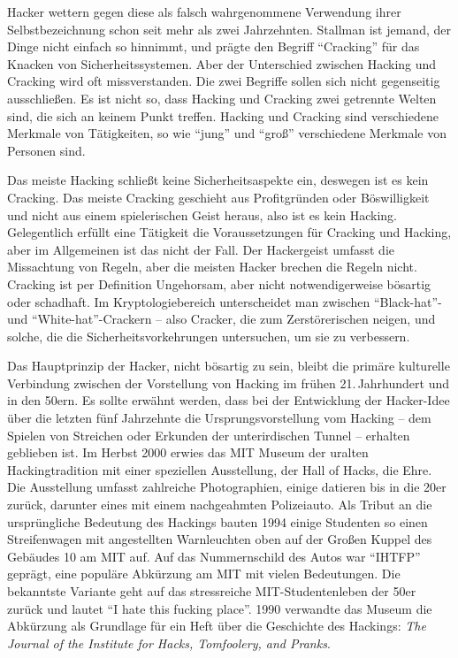 Hacker wettern gegen diese als falsch wahrgenommene Verwendung ihrer Selbstbezeichnung schon seit mehr als zwei Jahrzehnten. Stallman ist jemand, der Dinge nicht einfach so hinnimmt, und prägte den Begriff "`Cracking"' für das Knacken von Sicherheitssystemen. Aber der Unterschied zwischen Hacking und Cracking wird oft missverstanden. Die zwei Begriffe sollen sich nicht gegenseitig ausschließen. Es ist nicht so, dass Hacking und Cracking zwei getrennte Welten sind, die sich an keinem Punkt treffen. Hacking und Cracking sind verschiedene Merkmale von Tätigkeiten, so wie "`jung"' und "`groß"' verschiedene Merkmale von Personen sind.

Das meiste Hacking schließt keine Sicherheitsaspekte ein, deswegen ist es kein Cracking. Das meiste Cracking geschieht aus Profitgründen oder Böswilligkeit und nicht aus einem spielerischen Geist heraus, also ist es kein Hacking. Gelegentlich erfüllt eine Tätigkeit die Voraussetzungen für Cracking und Hacking, aber im Allgemeinen ist das nicht der Fall. Der Hackergeist umfasst die Missachtung von Regeln, aber die meisten Hacker brechen die Regeln nicht. Cracking ist per Definition Ungehorsam, aber nicht notwendigerweise bösartig oder schadhaft. Im Kryptologiebereich unterscheidet man zwischen "`Black-hat"'- und "`White-hat"'-Crackern – also Cracker, die zum Zerstörerischen neigen, und solche, die die Sicherheitsvorkehrungen untersuchen, um sie zu verbessern.

Das Hauptprinzip der Hacker, nicht bösartig zu sein, bleibt die primäre kulturelle Verbindung zwischen der Vorstellung von Hacking im frühen 21.\,Jahrhundert und in den 50ern. Es sollte erwähnt werden, dass bei der Entwicklung der Hacker-Idee über die letzten fünf Jahrzehnte die Ursprungsvorstellung vom Hacking – dem Spielen von Streichen oder Erkunden der unterirdischen Tunnel – erhalten geblieben ist. Im Herbst 2000 erwies das MIT Museum der uralten Hackingtradition mit einer speziellen Ausstellung, der Hall of Hacks, die Ehre. Die Ausstellung umfasst zahlreiche Photographien, einige datieren bis in die 20er zurück, darunter eines mit einem nachgeahmten Polizeiauto. Als Tribut an die ursprüngliche Bedeutung des Hackings bauten 1994 einige Studenten so einen Streifenwagen mit angestellten Warnleuchten oben auf der Großen Kuppel des Gebäudes 10 am MIT auf. Auf das Nummernschild des Autos war "`IHTFP"' geprägt, eine populäre Abkürzung am MIT mit vielen Bedeutungen. Die bekanntste Variante geht auf das stressreiche MIT-Studentenleben der 50er zurück und lautet "`I hate this fucking place"'. 1990 verwandte das Museum die Abkürzung als Grundlage für ein Heft über die Geschichte des Hackings: \textit{The Journal of the Institute for Hacks, Tomfoolery, and Pranks}.

